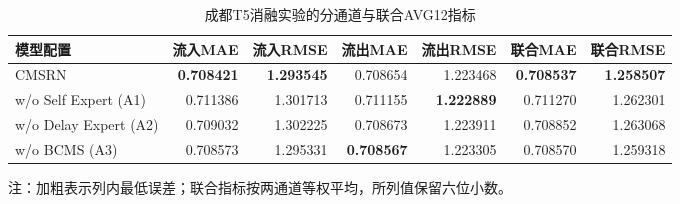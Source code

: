 \begin{table}[!htbp]
  \centering
  \caption{成都T5消融实验的分通道与联合AVG12指标}
  \label{tab:supp-ablation-channels}
  \begingroup
  \linespread{1}\fontsize{9}{11}\selectfont
  \setlength{\tabcolsep}{3pt}
  \renewcommand{\arraystretch}{1.08}
  \begin{tabular*}{\linewidth}{@{\extracolsep{\fill}}lrrrrrr@{}}
    \toprule
    模型配置 & 流入MAE & 流入RMSE & 流出MAE & 流出RMSE & 联合MAE & 联合RMSE \\
    \midrule
    CMSRN & \textbf{0.708421} & \textbf{1.293545} & 0.708654 & 1.223468 & \textbf{0.708537} & \textbf{1.258507} \\
    w/o Self Expert (A1) & 0.711386 & 1.301713 & 0.711155 & \textbf{1.222889} & 0.711270 & 1.262301 \\
    w/o Delay Expert (A2) & 0.709032 & 1.302225 & 0.708673 & 1.223911 & 0.708852 & 1.263068 \\
    w/o BCMS (A3) & 0.708573 & 1.295331 & \textbf{0.708567} & 1.223305 & 0.708570 & 1.259318 \\
    \bottomrule
  \end{tabular*}
  \par\vspace{3pt}
  \begin{minipage}{\linewidth}\footnotesize
  注：加粗表示列内最低误差；联合指标按两通道等权平均，所列值保留六位小数。
  \end{minipage}
  \endgroup
\end{table}
